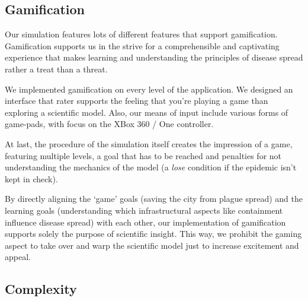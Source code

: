 \documentclass[table]{sig-alternate-05-2015}
\begin{document}
\subsection{Gamification}

Our simulation features lots of different features that support gamification. Gamification supports us in the strive for a comprehensible and captivating experience that makes learning and understanding the principles of disease spread rather a treat than a threat.

We implemented gamification on every level of the application. We designed an interface that rater supports the feeling that you're playing a game than exploring a scientific model. Also, our means of input include various forms of game-pads,  with focus on the XBox 360 / One controller.

At last, the procedure of the simulation itself creates the impression of a game, featuring multiple levels, a goal that has to be reached and penalties for not understanding the mechanics of the model (a \textit{lose} condition if the epidemic isn't kept in check). 

By directly aligning the `game' goals (saving the city from plague spread) and the learning goals (understanding which infrastructural aspects like containment influence disease spread) with each other, our implementation of gamification supports solely the purpose of scientific insight. This way, we prohibit the gaming aspect to take over and warp the scientific model just to increase excitement and appeal.

\subsection{Complexity}
\end{document}
